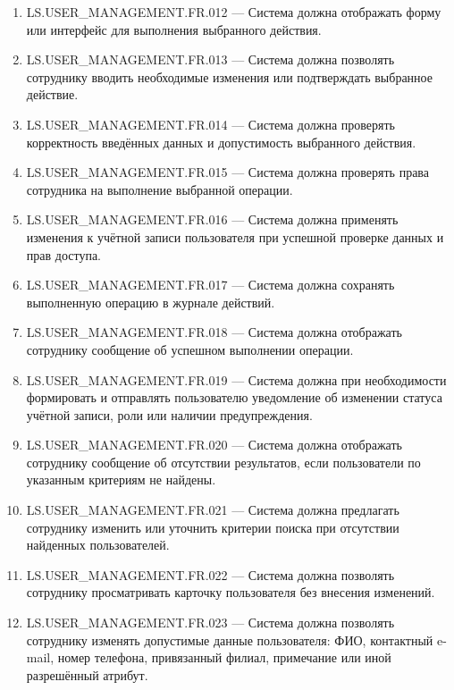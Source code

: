 \documentclass[12pt,a4paper]{article}
\begin{document}
\begin{enumerate}
		\item LS.USER\_MANAGEMENT.FR.012 --- Система должна отображать форму или
		интерфейс для выполнения выбранного действия.
		
		\item LS.USER\_MANAGEMENT.FR.013 --- Система должна позволять сотруднику
		вводить необходимые изменения или подтверждать выбранное действие.
		
		\item LS.USER\_MANAGEMENT.FR.014 --- Система должна проверять корректность
		введённых данных и допустимость выбранного действия.
		
		\item LS.USER\_MANAGEMENT.FR.015 --- Система должна проверять права
		сотрудника на выполнение выбранной операции.
		
		\item LS.USER\_MANAGEMENT.FR.016 --- Система должна применять изменения к
		учётной записи пользователя при успешной проверке данных и прав доступа.
		
		\item LS.USER\_MANAGEMENT.FR.017 --- Система должна сохранять выполненную
		операцию в журнале действий.
		
		\item LS.USER\_MANAGEMENT.FR.018 --- Система должна отображать сотруднику
		сообщение об успешном выполнении операции.
		
		\item LS.USER\_MANAGEMENT.FR.019 --- Система должна при необходимости
		формировать и отправлять пользователю уведомление об изменении статуса
		учётной записи, роли или наличии предупреждения.
		
		\item LS.USER\_MANAGEMENT.FR.020 --- Система должна отображать сотруднику
		сообщение об отсутствии результатов, если пользователи по указанным критериям
		не найдены.
		
		\item LS.USER\_MANAGEMENT.FR.021 --- Система должна предлагать сотруднику
		изменить или уточнить критерии поиска при отсутствии найденных пользователей.
		
		\item LS.USER\_MANAGEMENT.FR.022 --- Система должна позволять сотруднику
		просматривать карточку пользователя без внесения изменений.
		
		\item LS.USER\_MANAGEMENT.FR.023 --- Система должна позволять сотруднику
		изменять допустимые данные пользователя: ФИО, контактный e-mail, номер
		телефона, привязанный филиал, примечание или иной разрешённый атрибут.
		

\end{enumerate}
\end{document}
